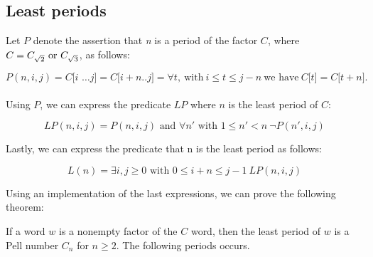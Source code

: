 \subsection{Least periods}
Let $P$ denote the assertion that
\textit{n} is a period of the factor 
$C$, where $C= C_{\sqrt{2}} \text{ or } C_{\sqrt{3}}$, as follows:

\begin{equation*}
    P(n,i,j) = C\big[\textit{i \ldots j} \big] = C\big[\textit{i}+\textit{n..j}\big]
    = \forall t,\ \text{with}\  i\leq t \leq j-n\  \text{we have}\  C\big[\textit{t}\big] = C\big[\textit{t}+\textit{n}\big].
\end{equation*}
\\
Using $P$, we can express the predicate $LP$ where $n$ is the least period of $C$:

$$LP(n,i,j) = P(n,i,j) \text{ and } \forall n' \text{ with } 1 \leq n' < n \  \neg P(n',i,j)$$

Lastly, we can express the predicate that n is the least period as follows:

$$L(n) = \exists i,j \geq 0 \text{ with } 0 \leq i+n \leq j-1 \  LP(n,i,j)$$


Using an implementation of the last expressions, we can prove the following theorem:

\begin{theorem}
If a word $w$ is a nonempty factor of the $C$ word, then the least period of $w$ is a Pell number $C_{n}$ for $n \geq 2$. The following periods occurs.
\end{theorem}

